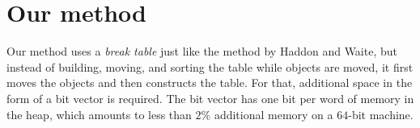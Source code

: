 \section{Our method}

Our method uses a \emph{break table} just like the method by Haddon
and Waite, but instead of building, moving, and sorting the table
while objects are moved, it first moves the objects and then
constructs the table.  For that, additional space in the form of a bit
vector is required.  The bit vector has one bit per word of memory in
the heap, which amounts to less than $2$\% additional memory on a
$64$-bit machine. 



